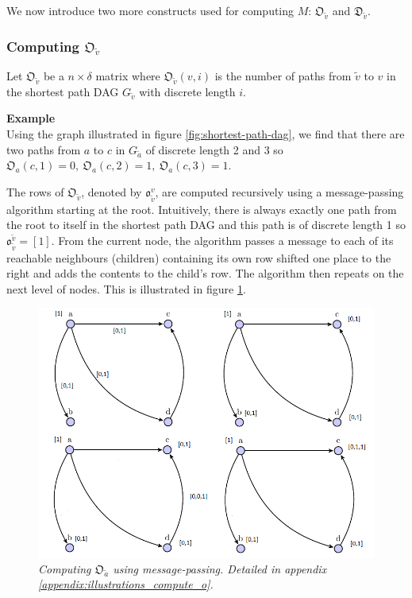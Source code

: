 \documentclass{article}
\begin{document}
We now introduce two more constructs used for computing $M$: $\mathfrak{O}_{\tilde{v}}$ and $\mathfrak{D}_{\tilde{v}}$. 

\subsubsection{Computing $\mathfrak{O}_{\tilde{v}}$}
Let $\mathfrak{O}_{\tilde{v}}$ be a $n\times\delta$ matrix where $\mathfrak{O}_{\tilde{v}}(v,i)$ is the number of paths from $\tilde{v}$ to $v$ in the shortest path DAG $G_{\tilde{v}}$ with discrete length $i$.

\textbf{Example}\\
Using the graph illustrated in figure \ref{fig:shortest-path-dag}, we find that there are two paths from $a$ to $c$ in $G_{\tilde{a}}$ of discrete length 2 and 3 so $\mathfrak{O}_{a}(c,1)=0,\ \mathfrak{O}_{a}(c,2)=1,\ \mathfrak{O}_{a}(c,3)=1$.

The rows of $\mathfrak{O}_{\tilde{v}}$, denoted by $\mathfrak{o}_{\tilde{v}}^v$, are computed recursively using a message-passing algorithm starting at the root. Intuitively, there is always exactly one path from the root to itself in the shortest path DAG and this path is of discrete length 1 so $\mathfrak{o}_{\tilde{v}}^{\tilde{v}}=[1]$. From the current node, the algorithm passes a message to each of its reachable neighbours (children) containing its own row shifted one place to the right and adds the contents to the child's row. The algorithm then repeats on the next level of nodes. This is illustrated in figure \ref{fig:compute_o}.


\begin{figure}[H]
	\includegraphics[width=12cm]{compute_o}
	\caption{\textit{Computing $\mathfrak{O}_{\tilde{a}}$ using message-passing. Detailed in appendix \ref{appendix:illustrations_compute_o}.}}
	\label{fig:compute_o}
\end{figure}
\end{document}
